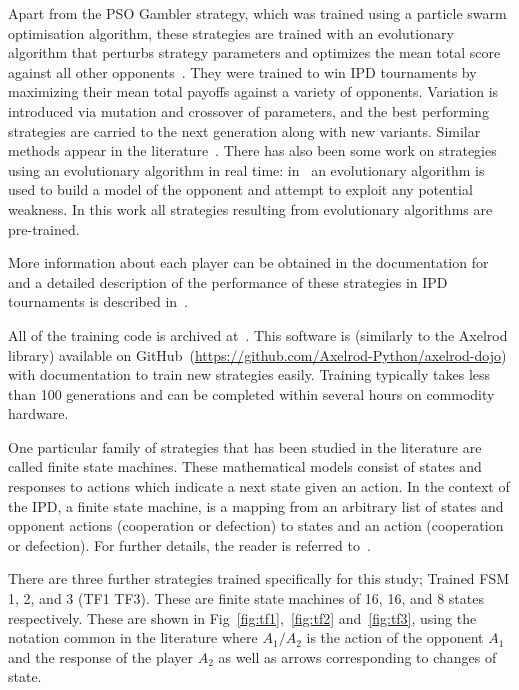 \documentclass[10pt,letterpaper]{article}
\begin{document}
Apart from the PSO Gambler strategy, which was trained using a particle swarm
optimisation algorithm, these strategies are trained with an evolutionary
algorithm that perturbs strategy parameters and optimizes the mean total score
against all other opponents~\cite{affenzeller2009genetic}. They were trained to
win IPD tournaments by maximizing their mean total payoffs against a variety
of opponents. Variation is
introduced via mutation and crossover of parameters, and the best performing
strategies are carried to the next generation along with new variants. Similar
methods appear in the literature~\cite{Ashlock2006}.
There has also been some work on strategies using an evolutionary algorithm in real time:
in~\cite{Gaudesi2016}
an evolutionary algorithm is used to build a model of the opponent and attempt
to exploit any potential weakness. In this work all strategies resulting from
evolutionary algorithms are pre-trained.

More information about each player can be obtained in the documentation for
\cite{axelrodproject} and a detailed description of the performance
of these strategies in IPD tournaments is described in~\cite{Harper2017}.

All of the training code is archived at~\cite{marc_harper_2017_824264}. This
software is (similarly to the Axelrod library) available on
GitHub~(\url{https://github.com/Axelrod-Python/axelrod-dojo})
with documentation to
train new strategies easily. Training
typically takes less than 100 generations and can be completed within several
hours on commodity hardware.

One particular family of strategies that has been studied in the literature are
called finite state machines. These mathematical models consist of states
and responses to actions which indicate a next state given an action. In the
context of the IPD, a finite state machine, is a mapping from an arbitrary list
of states and opponent actions (cooperation or defection) to states and an
action (cooperation or defection). For further details,
the reader is referred to~\cite{Ashlock2006, AshlockBook, Ashlock2007, Harper2017}.

There are three further strategies trained specifically for this
study; Trained FSM 1, 2, and 3 (TF1 \- TF3). These are finite state
machines of 16, 16, and 8 states respectively. These are shown in
Fig~\ref{fig:tf1},~\ref{fig:tf2} and~\ref{fig:tf3}, using the notation common in
the literature where \(A_1/A_2\) is the action of the opponent \(A_1\) and the
response of the player \(A_2\) as well as arrows corresponding to changes of
state.
\end{document}

